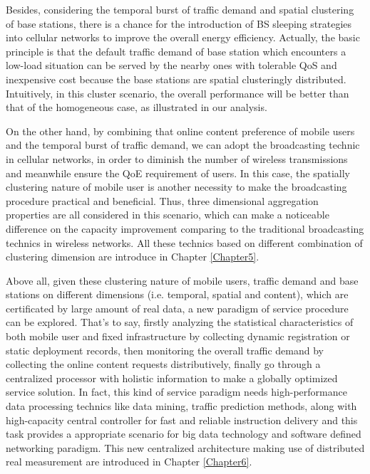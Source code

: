 Besides, considering the temporal burst of traffic demand and spatial clustering of base stations, there is a chance for the introduction of BS sleeping strategies into cellular networks to improve the overall energy efficiency. Actually, the basic principle is that the default traffic demand of base station which encounters a low-load situation can be served by the nearby ones with tolerable QoS and inexpensive cost because the base stations are spatial clusteringly distributed. Intuitively, in this cluster scenario, the overall performance will be better than that of the homogeneous case, as illustrated in our analysis.

On the other hand, by combining that online content preference of mobile users and the temporal burst of traffic demand, we can adopt the broadcasting technic in cellular networks, in order to diminish the number of wireless transmissions and meanwhile ensure the QoE requirement of users. In this case, the spatially clustering nature of mobile user is another necessity to make the broadcasting procedure practical and beneficial. Thus, three dimensional aggregation properties are all considered in this scenario, which can make a noticeable difference on the capacity improvement comparing to the traditional broadcasting technics in wireless networks. All these technics based on different combination of clustering dimension are introduce in Chapter \ref{Chapter5}.

Above all, given these clustering nature of mobile users, traffic demand and base stations on different dimensions (i.e. temporal, spatial and content), which are certificated by large amount of real data, a new paradigm of service procedure can be explored. That's to say, firstly analyzing the statistical characteristics of both mobile user and fixed infrastructure by collecting dynamic registration or static deployment records, then monitoring the overall traffic demand by collecting the online content requests distributively, finally go through a centralized processor with holistic information to make a globally optimized service solution. In fact, this kind of service paradigm needs high-performance data processing technics like data mining, traffic prediction methods, along with high-capacity central controller for fast and reliable instruction delivery and this task provides a appropriate scenario for big data technology and software defined networking paradigm. This new centralized architecture making use of distributed real measurement are introduced in Chapter \ref{Chapter6}.

